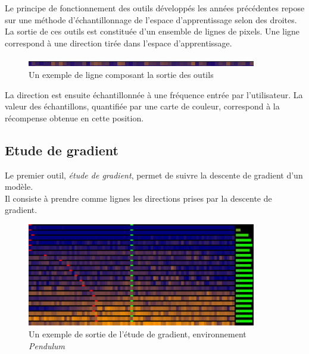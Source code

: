 \documentclass[12pt]{article}
\begin{document}
Le principe de fonctionnement des outils développés les années précédentes repose sur une méthode d’échantillonnage de l’espace d’apprentissage selon des droites. \\

La sortie de ces outils est constituée d’un ensemble de lignes de pixels. Une ligne correspond à une direction tirée dans l’espace d’apprentissage. \\

\begin{figure}[htp]
    \centering
    \includegraphics[width=10cm]{Images/Ligne}
    \caption{Un exemple de ligne composant la sortie des outils}
    \label{fig:ligne1}
\end{figure}

La direction est ensuite échantillonnée à une fréquence entrée par l’utilisateur. La valeur des échantillons, quantifiée par une carte de couleur, correspond à la récompense obtenue en cette position. \\

\subsection{Etude de gradient}

Le premier outil, \emph{étude de gradient}, permet de suivre la descente de gradient d’un modèle. \\

Il consiste à prendre comme lignes les directions prises par la descente de gradient. \\

\begin{figure}[htp]
    \centering
    \includegraphics[width=10cm]{Images/gradientStudy}
    \caption{Un exemple de sortie de l'étude de gradient, environnement \emph{Pendulum}}
    \label{fig:gradientStudy}
\end{figure}
\end{document}
